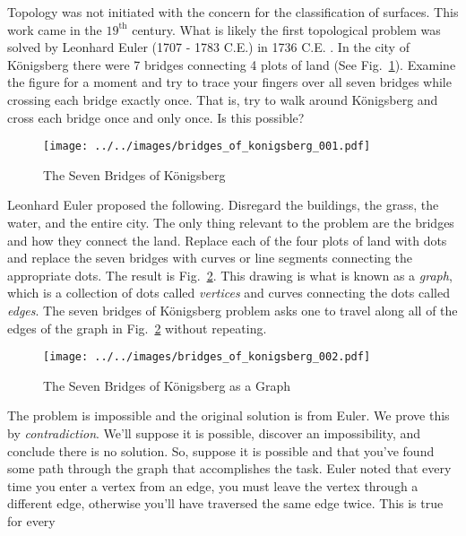     Topology was not initiated with the concern for the classification of
    surfaces. This work came in the $19^{\textrm{th}}$ century. What is likely
    the first topological problem was solved by Leonhard Euler
    (1707 - 1783 C.E.) in 1736 C.E. \cite{LeonhardEulerBridgesOfKonigsberg}. In
    the city of K\"{o}nigsberg there were 7 bridges connecting 4 plots of land
    (See Fig.~\ref{fig:bridges_of_konigsberg_001}). Examine the figure for a
    moment and try to trace your fingers over all seven bridges while crossing
    each bridge exactly once. That is, try to walk around K\"{o}nigsberg and
    cross each bridge once and only once. Is this possible?
    \begin{figure}
        \centering
        \texttt{[image: ../../images/bridges\_of\_konigsberg\_001.pdf]}
        \caption{The Seven Bridges of K\"{o}nigsberg}
        \label{fig:bridges_of_konigsberg_001}
    \end{figure}
    Leonhard Euler proposed the following. Disregard the buildings, the grass,
    the water, and the entire city. The only thing relevant to the problem are
    the bridges and how they connect the land. Replace each of the four plots
    of land with dots and replace the seven bridges with curves or
    line segments connecting the appropriate dots. The result is
    Fig.~\ref{fig:bridges_of_konigsberg_002}. This drawing is what is known as
    a \textit{graph}, which is a collection of dots called
    \textit{vertices} and curves connecting the dots called
    \textit{edges}. The seven bridges of K\"{o}nigsberg problem asks one to
    travel along all of the edges of the graph in
    Fig.~\ref{fig:bridges_of_konigsberg_002} without repeating.
    \par\hfill\par
    \begin{figure}
        \centering
        \texttt{[image: ../../images/bridges\_of\_konigsberg\_002.pdf]}
        \caption{The Seven Bridges of K\"{o}nigsberg as a Graph}
        \label{fig:bridges_of_konigsberg_002}
    \end{figure}
    The problem is impossible and the original solution is from Euler. We prove
    this by \textit{contradiction}. We'll suppose it is possible, discover an
    impossibility, and conclude there is no solution. So, suppose
    it is possible and that you've found some path through the graph that
    accomplishes the task. Euler noted that every time you enter a vertex from
    an edge, you must leave the vertex through a different edge,
    otherwise you'll have traversed the same edge twice. This is true for every
